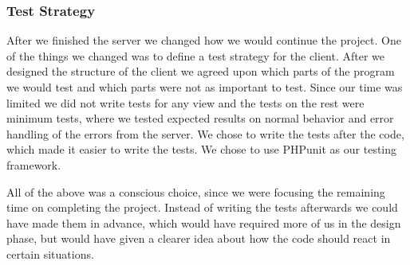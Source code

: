 \subsubsection{Test Strategy}
After we finished the server we changed how we would continue the project.
One of the things we changed was to define a test strategy for the client.
After we designed the structure of the client we agreed upon which parts of the program we would test and which parts were not as important to test.
Since our time was limited we did not write tests for any view and the tests on the rest were minimum tests, where we tested expected results on normal behavior and error handling of the errors from the server.
We chose to write the tests after the code, which made it easier to write the tests. We chose to use PHPunit as our testing framework.

All of the above was a conscious choice, since we were focusing the remaining time on completing the project.
Instead of writing the tests afterwards we could have made them in advance, which would have required more of us in the design phase, but would have given a clearer idea about how the code should react in certain situations.

